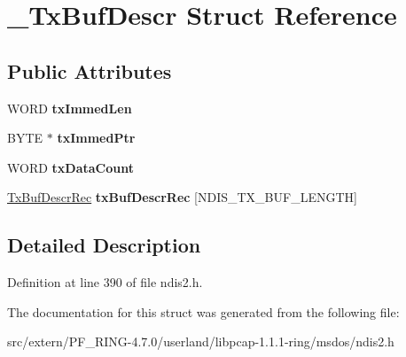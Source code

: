 \hypertarget{struct___tx_buf_descr}{
\section{\_\-TxBufDescr Struct Reference}
\label{struct___tx_buf_descr}
}
\subsection*{Public Attributes}
\begin{DoxyCompactItemize}
\item 
\hypertarget{struct___tx_buf_descr_a48cff2eb63906efdaaf09a743cf36a58}{
WORD {\bfseries txImmedLen}}
\label{struct___tx_buf_descr_a48cff2eb63906efdaaf09a743cf36a58}

\item 
\hypertarget{struct___tx_buf_descr_a9e960e372edf6458b3929c3b86455abd}{
BYTE $\ast$ {\bfseries txImmedPtr}}
\label{struct___tx_buf_descr_a9e960e372edf6458b3929c3b86455abd}

\item 
\hypertarget{struct___tx_buf_descr_aef98573af4cf0ec7330e7381494ff994}{
WORD {\bfseries txDataCount}}
\label{struct___tx_buf_descr_aef98573af4cf0ec7330e7381494ff994}

\item 
\hypertarget{struct___tx_buf_descr_a3df35bbb823c355e7b65ad6f1ed6f3de}{
\hyperlink{struct___tx_buf_descr_rec}{TxBufDescrRec} {\bfseries txBufDescrRec} \mbox{[}NDIS\_\-TX\_\-BUF\_\-LENGTH\mbox{]}}
\label{struct___tx_buf_descr_a3df35bbb823c355e7b65ad6f1ed6f3de}

\end{DoxyCompactItemize}


\subsection{Detailed Description}


Definition at line 390 of file ndis2.h.



The documentation for this struct was generated from the following file:\begin{DoxyCompactItemize}
\item 
src/extern/PF\_\-RING-\/4.7.0/userland/libpcap-\/1.1.1-\/ring/msdos/ndis2.h\end{DoxyCompactItemize}
